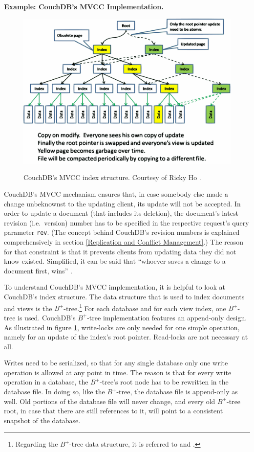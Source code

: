 \vspace{0.5em}
\noindent
{\bf Example: CouchDB's MVCC Implementation.}
\begin{figure}[ht]
	{\flushleft\includegraphics[width=\textwidth]{figures/MVCC}}
	\caption{CouchDB's MVCC index structure. Courtesy of Ricky Ho \cite{Ho09}.}
	\label{Ho09}
\end{figure}
CouchDB's MVCC mechanism ensures that, in case somebody else made a change unbeknownst to the updating client, its update will not be accepted. In order to update a document (that includes its deletion), the document's latest revision (i.e.\ version) number has to be specified in the respective request's query parameter {\tt rev}. (The concept behind CouchDB's revision numbers is explained comprehensively in section \ref{Replication and Conflict Management}.) The reason for that constraint is that it prevents clients from updating data they did not know existed. Simplified, it can be said that ``whoever saves a change to a document first, wins'' \cite[p.~39]{ASL10}.

To understand CouchDB's MVCC implementation, it is helpful to look at CouchDB's index structure. The data structure that is used to index documents and views is the $B^+$-tree.\footnote{Regarding the $B^+$-tree data structure, it is referred to \cite{Bay08} and \cite{Com79}.} For each database and for each view index, one $B^+$-tree is used. CouchDB's $B^+$-tree implementation features an append-only design. As illustrated in figure \ref{Ho09}, write-locks are only needed for one simple operation, namely for an update of the index's root pointer. Read-locks are not necessary at all.

Writes need to be serialized, so that for any single database only one write operation is allowed at any point in time. The reason is that for every write operation in a database, the $B^+$-tree's root node has to be rewritten in the database file. In doing so, like the $B^+$-tree, the database file is append-only as well. Old portions of the database file will never change, and every old $B^+$-tree root, in case that there are still references to it, will point to a consistent snapshot of the database.

